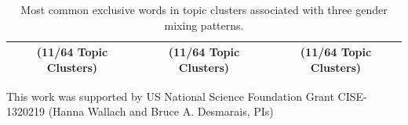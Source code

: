 \documentclass{pnastwo}
\begin{document}
\begin{article}
\begin{table}
\begin{tabular}{m{2.2in}|m{2.2in}|m{2.2in}}
		\midrule 
				\multicolumn{1}{c}{(11/64 Topic Clusters)} &  \multicolumn{1}{c}{(11/64 Topic Clusters)}  & \multicolumn{1}{c}{(11/64 Topic Clusters)}\\
		\bottomrule
	\end{tabular}
	\caption{\label{tab:top words for each pattern} Most common exclusive words in topic clusters associated with three gender mixing patterns.}
\end{table}



\begin{acknowledgments}
This work was supported by US National Science Foundation Grant CISE-1320219 (Hanna Wallach and Bruce A. Desmarais, PIs)
\vspace{-.5cm}
\end{acknowledgments}




\end{article}
\end{document}
